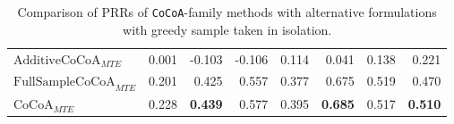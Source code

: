 \begin{table*}[h!]
\begin{tabular}{lrrrrrrr}
\midrule

$\text{AdditiveCoCoA}_{MTE}$ & 0.001& -0.103& -0.106& 0.114& 0.041& 0.138& 0.221\\
$\text{FullSampleCoCoA}_{MTE}$ & 0.201& 0.425& 0.557& 0.377& 0.675& 0.519& 0.470\\
$\text{CoCoA}_{MTE}$ & 0.228& \textbf{0.439}& 0.577& 0.395& \textbf{0.685}& 0.517& \textbf{0.510}\\
\bottomrule

\end{tabular}
\caption{Comparison of PRRs of \texttt{CoCoA}-family methods with alternative formulations with greedy sample taken in isolation.}
\label{tab:ablation_cocoa_greedy}
\end{table*}

